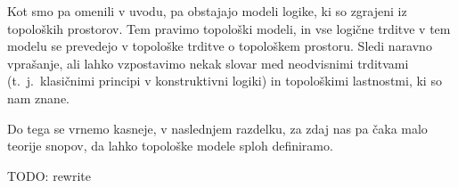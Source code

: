 Kot smo pa omenili v uvodu, pa obstajajo modeli logike, ki so zgrajeni iz
topoloških prostorov. Tem pravimo topološki modeli, in vse logične trditve v tem
modelu se prevedejo v topološke trditve o topološkem prostoru. Sledi naravno
vprašanje, ali lahko vzpostavimo nekak slovar med neodvisnimi trditvami
(t.~j.~klasičnimi principi v konstruktivni logiki) in topološkimi lastnostmi, ki
so nam znane.

Do tega se vrnemo kasneje, v naslednjem razdelku, za zdaj nas pa čaka malo
teorije snopov, da lahko topološke modele sploh definiramo.

TODO: rewrite







